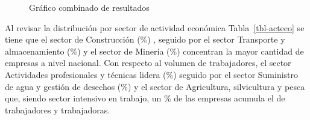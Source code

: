 \documentclass[
  11pt,
]{article}
\begin{document}
\FloatBarrier

\begin{figure}[H]

\caption{\label{fig-combined}Gráfico combinado de resultados}


\end{figure}%

\FloatBarrier

Al revisar la distribución por sector de actividad económica
Tabla~\ref{tbl-acteco} se tiene que el sector de Construcción
(\%) , seguido por el sector Transporte y almacenamiento
(\%) y el sector de Minería (\%) concentran la
mayor cantidad de empresas a nivel nacional. Con respecto al volumen de
trabajadores, el sector Actividades profesionales y técnicas lidera
(\%) seguido por el sector Suministro de agua y gestión de
desechos (\%) y el sector de Agricultura, silvicultura y
pesca que, siendo sector intensivo en trabajo, un \% de las
empresas acumula el  de trabajadores y trabajadoras.

\FloatBarrier
\end{document}
